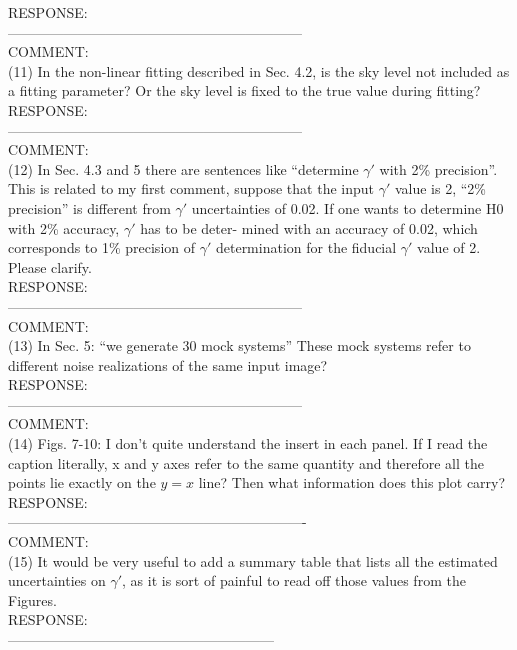 \documentclass[a4paper,11pt]{article}
\begin{document}
RESPONSE:
\\

---------------------------------------------------------------
\\
COMMENT:
\\
(11) In the non-linear fitting described in Sec. 4.2, is the sky level not included as a fitting parameter? Or the sky level is fixed to the true value during fitting?
\\

RESPONSE:
\\

---------------------------------------------------------------
\\
COMMENT:
\\
(12) In Sec. 4.3 and 5 there are sentences like “determine $\gamma'$ with 2\% precision”. This is related to my first comment, suppose that the input $\gamma'$ value is 2, “2\% precision” is different from $\gamma'$ uncertainties of 0.02. If one wants to determine H0 with 2\% accuracy, $\gamma'$ has to be deter- mined with an accuracy of 0.02, which corresponds to 1\% precision of $\gamma'$ determination for the fiducial $\gamma'$ value of 2. Please clarify.
\\

RESPONSE:
\\

---------------------------------------------------------------
\\
COMMENT:
\\
(13) In Sec. 5: “we generate 30 mock systems” These mock systems refer to different noise realizations of the same input image?
\\

RESPONSE:
\\

---------------------------------------------------------------
\\
COMMENT:
\\
(14) Figs. 7-10: I don’t quite understand the insert in each panel. If I read the caption literally, x and y axes refer to the same quantity and therefore all the points lie exactly on the $y = x$ line? Then what information does this plot carry?
\\

RESPONSE:
\\

----------------------------------------------------------------
\\
COMMENT:
\\
(15) It would be very useful to add a summary table that lists all the estimated uncertainties on $\gamma'$, as it is sort of painful to read off those values from the Figures.
\\

RESPONSE:
\\

---------------------------------------------------------
\end{document}
